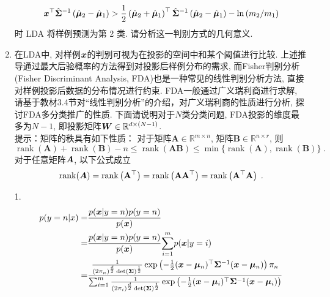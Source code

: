 \documentclass[answers]{exam}  %
\begin{document}
\begin{questions}
\begin{enumerate}
\begin{equation}
			      {\boldsymbol{x}}^{\top} \hat{\boldsymbol{\Sigma}}^{-1}\left(\hat{\boldsymbol{\mu}}_{2}-\hat{\boldsymbol{\mu}}_{1}\right)>\frac{1}{2}\left(\hat{\boldsymbol{\mu}}_{2}+\hat{\boldsymbol{\mu}}_{1}\right)^{\top} \hat{\boldsymbol{\Sigma}}^{-1}\left(\hat{\boldsymbol{\mu}}_{2}-\hat{\boldsymbol{\mu}}_{1}\right)-\ln \left(m_{2} / m_{1}\right)
		      \end{equation}时 LDA 将样例预测为第 2 类. 请分析这一判别方式的几何意义.
		\item 在LDA中, 对样例${\boldsymbol{x}}$的判别可视为在投影的空间中和某个阈值进行比较. 上述推导通过最大后验概率的方法得到对投影后样例分布的需求, 而Fisher判别分析 (Fisher Discriminant Analysis, FDA)也是一种常见的线性判别分析方法, 直接对样例投影后数据的分布情况进行约束.
		      FDA一般通过广义瑞利商进行求解, 请基于教材3.4节对“线性判别分析”的介绍，对广义瑞利商的性质进行分析, 探讨FDA多分类推广的性质.
		      下面请说明对于$N$类分类问题, FDA投影的维度最多为$N-1$, 即投影矩阵$\boldsymbol{W}\in\mathbb{R}^{d\times (N-1)}$.\\
		      提示：矩阵的秩具有如下性质：
		      对于矩阵$\mathbf{A}\in\mathbb{R}^{m \times n}$, 矩阵$\mathbf{B}\in\mathbb{R}^{n \times r}$, 则
		      \begin{equation}
			      \operatorname{rank}(\mathbf{A})+\operatorname{rank}(\mathbf{B})-n \leq \operatorname{rank}(\mathbf{A B}) \leq \min \{\operatorname{rank}(\mathbf{A}), \operatorname{rank}(\mathbf{B})\}\;.
		      \end{equation}
		      对于任意矩阵$\boldsymbol{A}$, 以下公式成立
		      \begin{equation}
			      \operatorname{rank}(\boldsymbol{A})=\operatorname{rank}\left(\mathbf{A}^{\top}\right)=\operatorname{rank}\left(\mathbf{A} \mathbf{A}^{\top}\right)=\operatorname{rank}\left(\mathbf{A}^{\top} \mathbf{A}\right)\;.
		      \end{equation}
	\end{enumerate}
	\begin{solution}
		\begin{enumerate}
			\item[1.]
			      \begin{align*}
				      p(y=n|x)=  & \frac{p(\vx|y=n)p(y=n)}{p(\vx)}                                                                                                                                                                                                                                                                                    \\=&\frac{p(\vx|y=n)p(y=n)}{p(\vx)}{\sum_{i=1}^{m}}p(\vx|y=i)\\
				      =          & \frac{\frac{1}{(2\pi_n)^{\frac{d}{2}}\det\left(\mSigma\right)^\frac{1}{2}}\exp\left(-\frac{1}{2}(\vx-\vmu_n)^\top\mSigma^{-1}(\vx-\vmu_n)\right)\pi_{n}}{\sum_{i=1}^{m}\frac{1}{(2\pi_i)^{\frac{d}{2}}\det\left(\mSigma\right)^\frac{1}{2}}\exp\left(-\frac{1}{2}(\vx-\vmu_i)^\top\mSigma^{-1}(\vx-\vmu_i)\right)} \\

\end{align*}
\end{enumerate}
\end{solution}
\end{questions}
\end{document}
